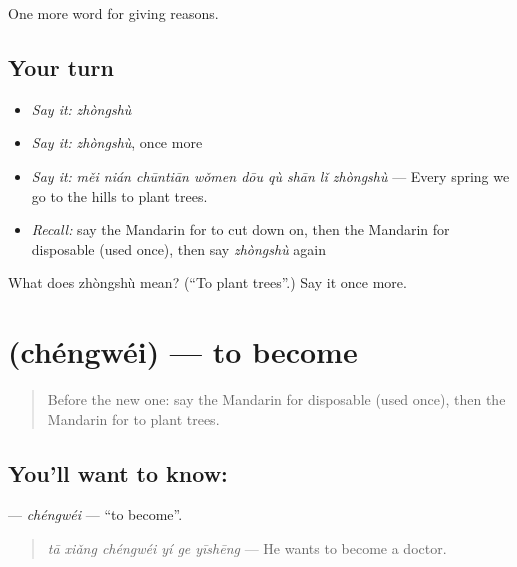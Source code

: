 \begin{grammarlens}[title={What you've built}]
One more word for giving reasons.
\end{grammarlens}

\subsection*{Your turn}
\begin{itemize}
\raggedright
  \item \emph{Say it:} \emph{zhòngshù}
  \item \emph{Say it:} \emph{zhòngshù}, once more
  \item \emph{Say it:} \emph{měi nián chūntiān wǒmen dōu qù shān lǐ zhòngshù} — Every spring we go to the hills to plant trees.
  \item \emph{Recall:} say the Mandarin for to cut down on, then the Mandarin for disposable (used once), then say \emph{zhòngshù} again
\end{itemize}

\begin{tcolorbox}[breakable,colback=teal!4,colframe=teal!35!black,title={Before you move on}]
What does zhòngshù mean? (\textquotedblleft{}To plant trees\textquotedblright{}.) Say it once more.
\end{tcolorbox}
\section[\texorpdfstring{\zh{成为} (chéngwéi)}{成为 (chéngwéi)}]{ (chéngwéi) — to become}

\label{lesson:ZH-C384-chengwei}



\begin{quote}
Before the new one: say the Mandarin for disposable (used once), then the Mandarin for to plant trees.
\end{quote}

\subsection*{You'll want to know: }
\textbf{} — \emph{chéngwéi} — \textquotedblleft{}to become\textquotedblright{}.

\begin{quote}
\textbf{} \emph{tā xiǎng chéngwéi yí ge yīshēng} — He wants to become a doctor.
\end{quote}

